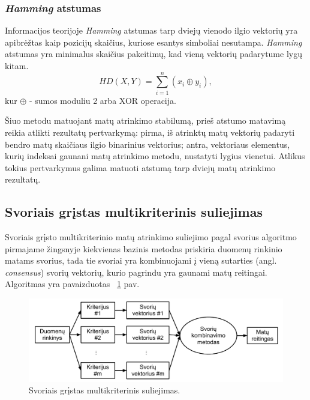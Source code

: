 \subsubsection{\textit{Hamming} atstumas}

Informacijos teorijoje \textit{Hamming} atstumas \cite{hamming1950error} tarp dviejų vienodo ilgio vektorių yra apibrėžtas kaip pozicijų skaičius, kuriose esantys simboliai nesutampa. \textit{Hamming} atstumas yra minimalus skaičius pakeitimų, kad vieną vektorių padarytume lygų kitam. 
\begin{equation}
\label{hamming_distance}
 HD(X, Y)= \sum_{i=1}^{n} (x_i \oplus y_i),
\end{equation}
kur $\oplus$ - sumos moduliu 2 arba XOR operacija.

Šiuo metodu matuojant matų atrinkimo stabilumą, prieš atstumo matavimą reikia atlikti rezultatų pertvarkymą: pirma, iš atrinktų matų vektorių padaryti bendro matų skaičiaus ilgio binarinius vektorius; antra, vektoriaus elementus, kurių indeksai gaunani matų atrinkimo metodu, nustatyti lygius vienetui. Atlikus tokius pertvarkymus galima matuoti atstumą tarp dviejų matų atrinkimo rezultatų.

\subsection{Svoriais grįstas multikriterinis suliejimas}

Svoriais grįsto multikriterinio matų atrinkimo suliejimo pagal svorius algoritmo pirmajame žingsnyje kiekvienas bazinis metodas priskiria duomenų rinkinio matams svorius, tada tie svoriai yra kombinuojami į vieną sutarties (angl. \textit{consensus}) svorių vektorių, kurio pagrindu yra gaunami matų reitingai. Algoritmas yra pavaizduotas ~\ref{fig:figure4} pav.
\begin{figure}
 \centering
 \includegraphics[width=1\textwidth]{images/score_based_fusion.pdf}
 \caption{Svoriais grįstas multikriterinis suliejimas.}
 \label{fig:figure4}
\end{figure}

